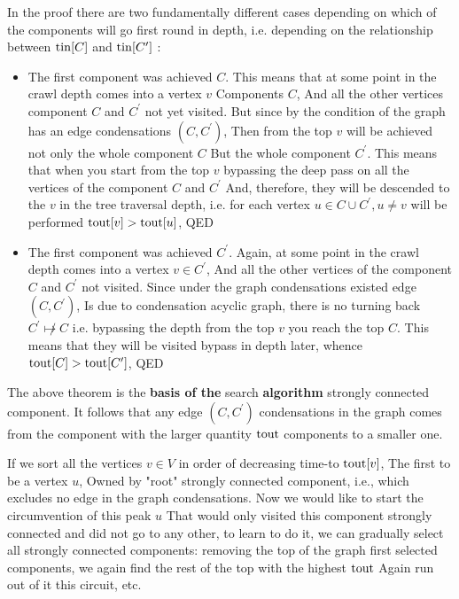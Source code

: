 In the proof there are two fundamentally different cases depending on which of the components will go first round in depth, i.e. depending on the relationship between ${\rm tin} [C]$ and ${\rm tin} [C ^ \prime]$ :

\begin{itemize} \item The first component was achieved $C$. This means that at some point in the crawl depth comes into a vertex $v$ Components $C$, And all the other vertices component $C$ and $C ^ \prime$ not yet visited. But since by the condition of the graph has an edge condensations $(C, C ^ \prime)$, Then from the top $v$ will be achieved not only the whole component $C$ But the whole component $C ^ \prime$. This means that when you start from the top $v$ bypassing the deep pass on all the vertices of the component $C$ and $C ^ \prime$ And, therefore, they will be descended to the $v$ in the tree traversal depth, i.e. for each vertex $u \in C \cup C ^ \prime, u \ne v$ will be performed ${\rm tout} [v]> {\rm tout} [u]$, QED \item The first component was achieved $C ^ \prime$. Again, at some point in the crawl depth comes into a vertex $v \in C ^ \prime$, And all the other vertices of the component $C$ and $C ^ \prime$ not visited. Since under the graph condensations existed edge $(C, C ^ \prime)$, Is due to condensation acyclic graph, there is no turning back $C ^ \prime \not \mapsto C$ i.e. bypassing the depth from the top $v$ you reach the top $C$. This means that they will be visited bypass in depth later, whence ${\rm tout} [C]> {\rm tout} [C ^ \prime]$, QED \end{itemize}

The above theorem is the \textbf{basis of the} search \textbf{algorithm} strongly connected component. It follows that any edge $(C, C ^ \prime)$ condensations in the graph comes from the component with the larger quantity ${\rm tout}$ components to a smaller one.

If we sort all the vertices $v \in V$ in order of decreasing time-to ${\rm tout} [v]$, The first to be a vertex $u$, Owned by "root" strongly connected component, i.e., which excludes no edge in the graph condensations. Now we would like to start the circumvention of this peak $u$ That would only visited this component strongly connected and did not go to any other, to learn to do it, we can gradually select all strongly connected components: removing the top of the graph first selected components, we again find the rest of the top with the highest ${\rm tout}$ Again run out of it this circuit, etc.

